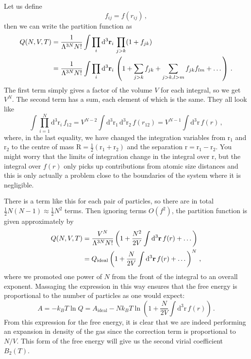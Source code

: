 \documentclass{article}
\theoremstyle{plain}\theoremheaderfont{\normalfont\bfseries}\theorembodyfont{\rmfamily}\theoremseparator{.}\newtheorem*{thm}{Theorem}\newtheorem*{law}{Law}\newtheorem*{pos}{Postulate}
\numberwithin{equation}{section}
\newcommand{\dd}[2][]{\mathrm{d}^{#1} #2\,}
\newcommand{\vb}[1]{\bm{\mathrm{#1}}}
\begin{document}
    Let us define
    \begin{equation}
        f_{ij}=f(r_{ij})\,,
    \end{equation}
    then we can write the partition function as
    \begin{align}
        Q(N,V,T)&=\frac{1}{\Lambda^{3N}N!}\int\prod_{i}\dd[3]{\vb{r}_i}\prod_{j>k}(1+f_{jk})\notag\\
        &=\frac{1}{\Lambda^{3N}N!}\int\prod_{i}\dd[3]{\vb{r}_i}\left(1+\sum_{j>k}f_{jk}+\sum_{j>k,l>m}f_{jk}f_{lm}+\dots\right)\,.
    \end{align}
    The first term simply gives a factor of the volume \(V\) for each integral, so we get \(V^N\). The second term has a sum, each element of which is the same. They all look like
    \begin{equation}
        \int\prod_{i=1}^{N}\dd[3]{\vb{r}_i}f_{12}=V^{N-2}\int\dd[3]{\vb{r}_1}\dd[3]{\vb{r}_2}f(r_{12})=V^{N-1}\int\dd[3]{\vb{r}}f(r)\,,
    \end{equation}
    where, in the last equality, we have changed the integration variables from \(\vb{r}_1\) and \(\vb{r}_2\) to the centre of mass \(\vb{R}=\frac{1}{2}(\vb{r}_1+\vb{r}_2)\) and the separation \(\vb{r}=\vb{r}_1-\vb{r}_2\). You might worry that the limits of integration change in the integral over \(\vb{r}\), but the integral over \(f(r)\) only picks up contributions from atomic size distances and this is only actually a problem close to the boundaries of the system where it is negligible.

    There is a term like this for each pair of particles, so there are in total \(\frac{1}{2}N(N-1)\approx\frac{1}{2}N^2\) terms. Then ignoring terms \(O(f^2)\), the partition function is given approximately by
    \begin{align}
        Q(N,V,T)&=\frac{V^N}{\Lambda^{3N}N!}\left(1+\frac{N^2}{2V}\int\dd[3]{\vb{r}}f(r)+\dots\right)\notag\\
        &=Q_{\text{ideal}}\left(1+\frac{N}{2V}\int\dd[3]{\vb{r}}f(r)+\dots\right)^N\,,
    \end{align}
    where we promoted one power of \(N\) from the front of the integral to an overall exponent. Massaging the expression in this way ensures that the free energy is proportional to the number of particles as one would expect:
    \begin{equation}\label{intgasf}
        A=-k_BT\ln Q=A_\text{ideal}-Nk_BT\ln\left(1+\frac{N}{2V}\int\dd[3]{\vb{r}}f(r)\right)\,.
    \end{equation}
    From this expression for the free energy, it is clear that we are indeed performing an expansion in density of the gas since the correction term is proportional to \(N/V\). This form of the free energy will give us the second virial coefficient \(B_2(T)\).
\end{document}
